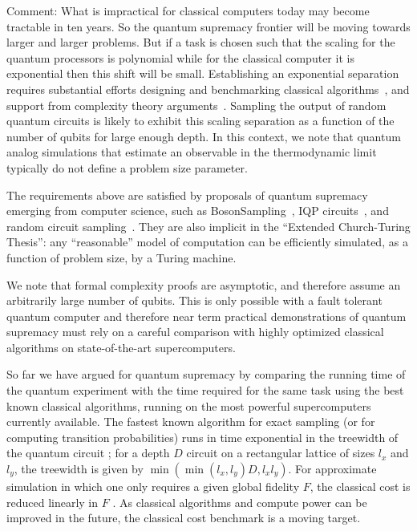 \begin{enumerate}
Comment: What is impractical for classical computers today may become tractable in ten years. So the quantum supremacy frontier will be moving towards larger and larger problems. But if a task is chosen such that the scaling for the quantum processors is polynomial while for the classical computer it is exponential then this shift will be small. Establishing an exponential separation requires substantial efforts designing and benchmarking classical algorithms~\cite{RAED07x,smelyanskiy2016qhipster,boixo2018characterizing,Boi17,villalonga2019flexible,RAED19a,villalonga2019establishing,chen2018classical,MS08,zhang2019alibaba}, and support from complexity theory arguments~\cite{boixo2018characterizing,aaronson2017complexity,Bou19}. Sampling the output of random quantum circuits is likely to exhibit this scaling separation as a function of the number of qubits for large enough depth. In this context, we note that quantum analog simulations that estimate an observable in the thermodynamic limit typically do not define a problem size parameter. 
\end{enumerate}
The requirements above are satisfied by proposals of quantum supremacy emerging from computer science, such as BosonSampling~\cite{AA11}, IQP circuits~\cite{BM16}, and random circuit sampling~\cite{boixo2018characterizing,neill2018blueprint,aaronson2017complexity,Bou19,movassagh2019cayley}. They are also implicit in the “Extended Church-Turing Thesis”: any “reasonable” model of computation can be efficiently simulated, as a function of problem size, by a Turing machine. 

We note that formal complexity proofs are asymptotic, and therefore assume an arbitrarily large number of qubits. This is only possible with a fault tolerant quantum computer and therefore near term practical demonstrations of quantum supremacy must rely on a careful comparison with highly optimized classical algorithms on state-of-the-art supercomputers. 

So far we have argued for quantum supremacy by comparing the running time of the quantum experiment with the time required for the same task using the best known classical algorithms, running on the most powerful supercomputers currently available. The fastest known algorithm for exact sampling (or for computing transition probabilities) runs in time exponential in the treewidth of the quantum circuit \cite{MS08, Boi17}; for a depth $D$ circuit on a rectangular lattice of sizes $l_x$ and  $l_y$, the treewidth is given by $\min(\min(l_x, l_y)D, l_x l_y)$. For approximate simulation in which one only requires a given global fidelity $F$, the classical cost is reduced linearly in $F$ \cite{markov_quantum_2018}. As classical algorithms and compute power can be improved in the future, the classical cost benchmark is a moving target.  

